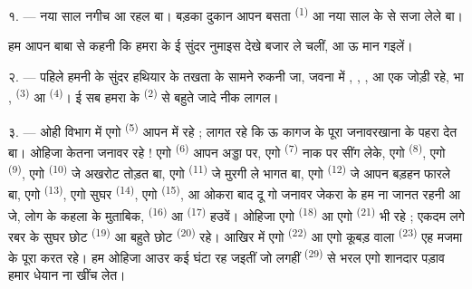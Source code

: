 \VUsaut{4.0mm}
\VUsaut{2.0mm}
\VUsaut{3.4mm}

१. --- नया साल नगीच आ रहल बा। बड़का दुकान आपन बसता 
\textsuperscript{(1)} आ नया साल के  से सजा लेले बा।

हम आपन बाबा से कहनी कि हमरा के ई सुंदर नुमाइस देखे बजार ले चलीं, आ ऊ
मान गइलें।

२. --- पहिले हमनी के सुंदर हथियार के तखता के सामने रुकनी जा, जवना में
, , ,  आ एक जोड़ी  रहे, भा ,
 \textsuperscript{(3)} आ  \textsuperscript{(4)}।
ई सब हमरा के  \textsuperscript{(2)} से बहुते जादे नीक
लागल।

\VUsaut{3.0mm}
\VUsaut{2.6mm}

३. --- ओही विभाग में एगो  \textsuperscript{(5)} आपन
 में रहे ; लागत रहे कि ऊ कागज के पूरा जनावरखाना
के पहरा देत बा। ओहिजा केतना जनावर रहे ! एगो 
\textsuperscript{(6)} आपन अड्डा पर, एगो 
\textsuperscript{(7)} नाक पर सींग लेके, एगो 
\textsuperscript{(8)}, एगो 
\textsuperscript{(9)}, एगो  \textsuperscript{(10)} जे अखरोट
तोड़त बा, एगो  \textsuperscript{(11)} जे मुरगी ले भागत बा,
एगो  \textsuperscript{(12)} जे आपन बड़हन  फारले
बा, एगो  \textsuperscript{(13)}, एगो सुघर 
\textsuperscript{(14)}, एगो  \textsuperscript{(15)}, आ ओकरा
बाद दू गो जनावर जेकरा के हम ना जानत रहनी आ जे, लोग के कहला के मुताबिक,
 \textsuperscript{(16)} आ  \textsuperscript{(17)}
हउवें। ओहिजा एगो  \textsuperscript{(18)} आ एगो
 \textsuperscript{(21)} भी रहे ; एकदम लगे रबर के सुघर छोट
 \textsuperscript{(19)} आ बहुते छोट 
\textsuperscript{(20)} रहे। आखिर में एगो 
\textsuperscript{(22)} आ एगो कूबड़ वाला 
\textsuperscript{(23)} एह मजमा के पूरा करत रहे। हम ओहिजा आउर कई घंटा रह
जइतीं जो लगहीं  \textsuperscript{(29)} से भरल एगो
शानदार पड़ाव हमार धेयान ना खींच लेत।

\VUsaut{4.0mm}
\VUsaut{2.8mm}

